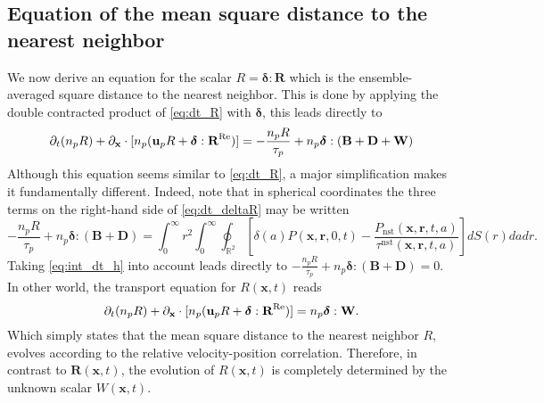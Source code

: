 \subsection{Equation of the mean square distance to the nearest neighbor}

We now derive an equation for the scalar $R = \bm\delta : \textbf{R}$ which is the ensemble-averaged square distance to the nearest neighbor. 
This is done by applying the double contracted product of \ref{eq:dt_R} with $\bm\delta$, this leads directly to 
\begin{equation}
    \pddt (n_pR)
    + \pddx \cdot [n_p(\textbf{u}_pR
    + \bm\delta :\textbf{R}^\text{Re})]
    = 
    - \frac{n_pR}{\tau_p}
    +n_p  \bm\delta : (\textbf{B}+\textbf{D}+\textbf{W})
    \label{eq:dt_deltaR}
\end{equation}
Although this equation seems similar to \ref{eq:dt_R}, a major simplification makes it fundamentally different. 
Indeed, note that in spherical coordinates the three terms on the right-hand side of \ref{eq:dt_deltaR} may be written
\begin{equation*}
    - \frac{n_pR}{\tau_p}
    + n_p  \bm\delta : (\textbf{B}+\textbf{D})
    = 
    \int_0^\infty r^2 \int_{0}^{\infty}\oint_{\mathbb{R}^2}\left[
        \delta(a)P(\textbf{x},\textbf{r},0,t)
    - \frac{P_\text{nst}(\textbf{x},\textbf{r},t,a)}{\tau^\text{nst}(\textbf{x},\textbf{r},t,a)}
    \right]dS(r) da dr.
\end{equation*}
Taking \ref{eq:int_dt_h} into account leads directly to $- \frac{n_pR}{\tau_p} + n_p  \bm\delta : (\textbf{B}+\textbf{D}) = 0$. 
In other world, the transport equation for $R(\textbf{x},t)$ reads 
\begin{equation}
    \pddt (n_pR)
    + \pddx \cdot [n_p(\textbf{u}_pR
    + \bm\delta : \textbf{R}^\text{Re})]
    = 
    n_p\bm\delta : \textbf{W}. 
    \label{eq:dt_deltaR2}
\end{equation}
Which simply states that the mean square distance to the nearest neighbor $R$, evolves according to the relative velocity-position correlation.
Therefore, in contrast to $\textbf{R}(\textbf{x},t)$, the evolution of $R(\textbf{x},t)$ is completely determined by the unknown scalar $W(\textbf{x},t)$. 


